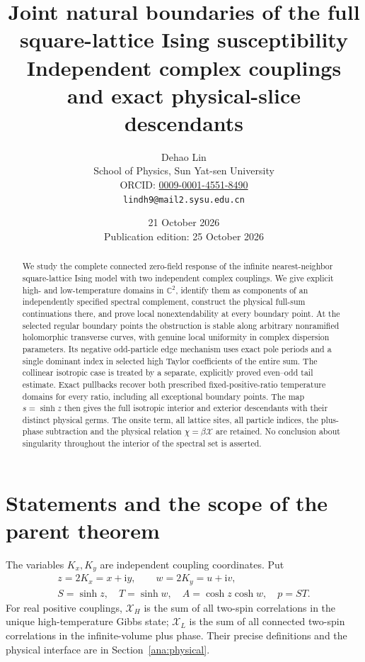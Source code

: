 \documentclass[11pt]{article}
\title{Joint natural boundaries of the full square-lattice\newline
Ising susceptibility\newline
\large Independent complex couplings and exact physical-slice descendants}
\author{Dehao Lin\\School of Physics, Sun Yat-sen University\\\small ORCID: \href{https://orcid.org/0009-0001-4551-8490}{0009-0001-4551-8490}\\\small\texttt{lindh9@mail2.sysu.edu.cn}}
\date{21 October 2026\\\small Publication edition: 25 October 2026}
\numberwithin{equation}{section}
\theoremstyle{definition}
\newcommand{\C}{\mathbb C}
\newcommand{\ii}{\mathrm i}
\begin{document}
\maketitle
\begin{abstract}
We study the complete connected zero-field response of the infinite
nearest-neighbor square-lattice Ising model with two independent complex
couplings. We give explicit high- and low-temperature domains in
\(\C^2\), identify them as components of an independently specified
spectral complement, construct the physical full-sum continuations there,
and prove local nonextendability at every boundary point. At the selected
regular boundary points the obstruction is stable along arbitrary
nonramified holomorphic transverse curves,
with genuine local uniformity in complex dispersion parameters. Its
negative odd-particle edge mechanism uses exact pole periods and a single
dominant index in selected high Taylor coefficients of the entire sum.
The collinear isotropic case is treated by a separate, explicitly proved
even--odd tail estimate. Exact pullbacks recover both prescribed
fixed-positive-ratio temperature domains for every ratio, including all
exceptional boundary points. The map \(s=\sinh z\) then gives the full
isotropic interior and exterior descendants with their distinct physical
germs. The onsite term, all lattice sites, all particle indices, the
plus-phase subtraction and the physical relation \(\chi=\beta\mathcal X\)
are retained. No conclusion about singularity throughout the interior
of the spectral set is asserted.
\end{abstract}

\section{Statements and the scope of the parent theorem}
\label{main:statement}

The variables \(K_x,K_y\) are independent coupling coordinates.
Put
\[
 \begin{gathered}
 z=2K_x=x+\ii y,\qquad w=2K_y=u+\ii v,\\
 S=\sinh z,\quad T=\sinh w,\quad A=\cosh z\cosh w,\quad p=ST.
 \end{gathered}
\]
For real positive couplings, \(\mathcal X_H\) is the sum of all
two-spin correlations in the unique high-temperature Gibbs state;
\(\mathcal X_L\) is the sum of all connected two-spin correlations
in the infinite-volume plus phase. Their precise definitions and the
physical interface are in Section~\ref{ana:physical}.
\end{document}
